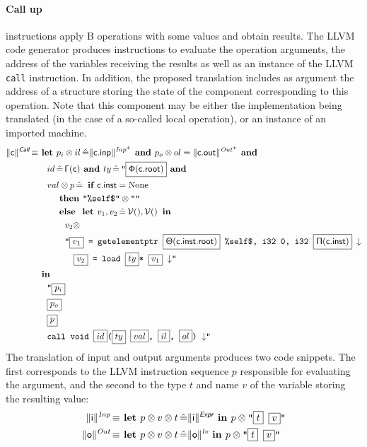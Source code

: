 \documentclass{article}
\newcommand{\trad}[2]{\ensuremath{\lVert \textsf{#1} \rVert^{\textit{#2}}}}
\newcommand{\nl}[0]{\ensuremath{\downarrow}}
\DeclareMathOperator{\isdef}{\equiv}
\DeclareMathOperator{\variable}{\mathcal{V}()}
\newcommand{\llvm}[1]{\texttt{#1}}
\newcommand{\B}[1]{\textsf{#1}}
\newcommand{\ListOf}[1]{$\mbox{#1}^+$}
\newcommand{\IF}[0]{\textbf{ if }}
\newcommand{\ELSE}[0]{\textbf{ else }}
\newcommand{\THEN}[0]{\textbf{ then }}
\newcommand{\LET}[0]{\textbf{ let }}
\DeclareMathOperator{\BE}{\hat{=}}
\newcommand{\IN}[0]{\textbf{ in }}
\newcommand{\AND}[0]{\textbf{ and }}
\newcommand{\PH}[1]{\framebox{$#1$}}
\newcommand{\sep}[0]{\otimes}
\newcommand{\Global}[0]{\ensuremath{\sf\Gamma}}
\newcommand{\idx}[0]{\ensuremath{\sf\Pi}}
\newcommand{\state}[0]{\ensuremath{\sf\Theta}}
\newcommand{\stateref}[0]{\ensuremath{\sf\Phi}}
\newcommand{\self}[0]{\llvm{\%self\$}}
\begin{document}
\paragraph{Call up} instructions apply B operations with some values and obtain
results. The LLVM code generator produces instructions to evaluate the operation
arguments, the address of the variables receiving the results as well as an
instance of the LLVM \llvm{call} instruction. In addition, the proposed
translation includes as argument the address of a structure storing the state of
the component corresponding to this operation. Note that this component may be
either the implementation being translated (in the case of a so-called local
operation), or an instance of an imported machine.
\begin{align*}
  \trad{c}{\B{Call}} \isdef
  & \LET p_i \sep il \BE \trad{c.inp}{\ListOf{Inp}} \AND p_o \sep ol =
  \trad{c.out}{\ListOf{Out}} \AND \\
  & \quad id \BE {\Global(\B{c})} \AND ty \BE \llvm{"\PH{\stateref(\B{c.root})}} \AND \\
  & \quad val \sep p \BE \IF \B{c.inst} = \text{None} \\
  & \quad \quad \THEN \llvm{"\self"} \sep \llvm{""} \\
  & \quad \quad \ELSE \LET v_1, v_2 \BE \variable, \variable \IN \\
  & \quad \quad \quad v_2 \sep \\
  & \quad \quad \quad \llvm{"\PH{v_1} = getelementptr \PH{ \state({\B{c.inst.root}})} \self, i32 0, i32 \PH{\idx(\B{c.inst})} \nl} \\
  & \quad \quad \quad \quad \llvm{\PH{v_2} = load \PH{ty}* \PH{v_1} \nl"} \\
  & \IN \\
  & \quad \llvm{"\PH{p_i}} \\
  & \quad \llvm{\PH{p_o}} \\
  & \quad \llvm{\PH{p}} \\
  & \quad \llvm{call void \PH{id}(\PH{ty} \PH{val}, \PH{il}, \PH{ol}) \nl"}
\end{align*}
The translation of input and output arguments produces two code snippets. The
first corresponds to the LLVM instruction sequence $p$ responsible for
evaluating the argument, and the second to the type $t$ and name $v$ of the
variable storing the resulting value:
\begin{align*}
  \trad{i}{Inp} \isdef
  & \LET p \sep v \sep t \BE \trad{i}{\B{Expr}} \IN p \sep \llvm{"\PH{t} \PH{v}"}\\
  \trad{o}{Out} \isdef
  & \LET p \sep v \sep t \BE \trad{o}{lv} \IN p \sep \llvm{"\PH{t} \PH{v}"}
\end{align*}
\end{document}
